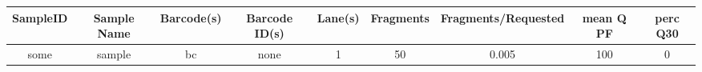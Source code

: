 \begin{center}
\begin{tabular}{|c | c | c | c | c | c | c | c | c |}
\hline
SampleID & Sample Name & Barcode(s) & Barcode ID(s) & Lane(s) & Fragments & Fragments/Requested & mean Q PF & perc Q30\\
\hline\hline
some & sample & bc & none & 1 & 50 & 0.005 & 100 & 0\\
\hline
\end{tabular}
\end{center}